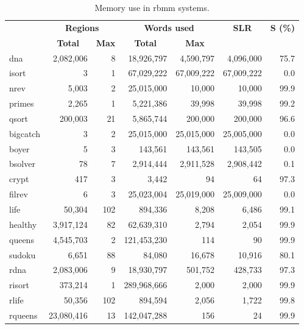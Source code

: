 \documentclass{tlp}
\begin{document}
\begin{table}[tb]
  \centering
  \small
  \caption{Memory use in rbmm systems.}
  \begin{tabular}{l|*{6}{r|}}
    \hline
    \hline
    \multirow{2}{*}{} & \multicolumn{2}{c|}{\textbf{Regions}}
    & \multicolumn{2}{c|}{\textbf{Words used}}
    & \multicolumn{1}{c|}{\multirow{2}{*}{\textbf{SLR}}}
    & \multicolumn{1}{c|}{\multirow{2}{*}{\textbf{S (\%)}}} \\
    & \multicolumn{1}{c}{\textbf{Total}}
    & \multicolumn{1}{c|}{\textbf{Max}}
    & \multicolumn{1}{c}{\textbf{Total}}
    & \multicolumn{1}{c|}{\textbf{Max}} & & \\
    \hline
    dna      & 2,082,006 &   8 &  18,926,797 &  4,590,797 & 4,096,000 & 75.7 \\
    isort    &         3 &   1 &  67,029,222 & 67,009,222 &67,009,222 &  0.0 \\
    nrev     &     5,003 &   2 &  25,015,000 &     10,000 &    10,000 & 99.9 \\
    primes   &     2,265 &   1 &   5,221,386 &     39,998 &    39,998 & 99.2 \\
    qsort    &   200,003 &  21 &   5,865,744 &    200,000 &   200,000 & 96.6 \\
    \hline
    bigcatch &         3 &   2 &  25,015,000 & 25,015,000 &25,005,000 &  0.0 \\
    boyer    &         5 &   3 &     143,561 &    143,561 &   143,505 &  0.0 \\
    bsolver  &        78 &   7 &   2,914,444 &  2,911,528 & 2,908,442 &  0.1 \\
    crypt    &       417 &   3 &       3,442 &         94 &        64 & 97.3 \\
    filrev   &         6 &   3 &  25,023,004 & 25,019,000 &25,009,000 &  0.0 \\
    life     &    50,304 & 102 &     894,336 &      8,208 &     6,486 & 99.1 \\
    healthy  & 3,917,124 &  82 &  62,639,310 &      2,794 &     2,054 & 99.9 \\
    queens   & 4,545,703 &   2 & 121,453,230 &        114 &        90 & 99.9 \\
    sudoku   &     6,651 &  88 &      84,080 &     16,678 &    10,916 & 80.1 \\
    \hline
    rdna     & 2,083,006 &   9 &  18,930,797 &    501,752 &   428,733 & 97.3 \\
    risort   &   373,214 &   1 & 289,968,666 &      2,000 &     2,000 & 99.9 \\
    rlife    &    50,356 & 102 &     894,594 &      2,056 &     1,722 & 99.8 \\
    rqueens  &23,080,416 &  13 & 142,047,288 &        156 &        24 & 99.9 \\
    \hline
    \hline
  \end{tabular}
  \normalsize
  \label{table:experiment:memory}
\end{table}
\end{document}
